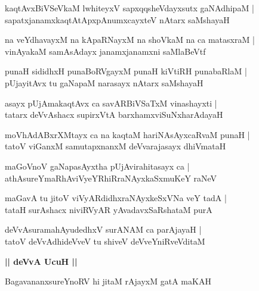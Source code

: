 \documentclass[twoside,12pt,openright]{book}
\newcounter{shloka}[chapter]
\def\uvaca#1{\centerline{{\large\textbf{#1}}}}
\begin{document}
\begin{shloka}%
kaqtAvxBiVSeVkaM lwhiteyxV sapxqqsheVdayxsutx gaNAdhipaM |\\
sapatxjanamxkaqtAtApxpAnumxcayxteV nAtarx saMshayaH 
\end{shloka}

\begin{shloka}%
na veYdhavayxM na kApaRNayxM na shoVkaM na ca matasxraM |\\
vinAyakaM samAsAdayx janamxjanamxni saMlaBeVtf
\end{shloka}

\begin{shloka}%
punaH sididhxH punaBoRVgayxM punaH kiVtiRH punabaRlaM |\\
pUjayitAvx tu gaNapaM narasayx nAtarx saMshayaH
\end{shloka}

\begin{shloka}%
asayx pUjAmakaqtAvx ca savARBiVSaTxM vinashayxti |\\
tatarx deVvAshacx supirxVtA barxhamxviSuNxharAdayaH 
\end{shloka}

\begin{shloka}%
moVhAdABxrXMtayx ca na kaqtaM hariNAsAyxcaRvaM punaH |\\
tatoV viGanxM samutapxnanxM deVvarajasayx dhiVmataH 
\end{shloka}

\begin{shloka}%
maGoVnoV gaNapasAyxtha pUjAvirahitasayx ca |\\
athAsureYmaRhAviVyeYRhiRraNAyxkaSxmuKeY raNeV 
\end{shloka}

\begin{shloka}%
maGavA tu jitoV viVyARdidhxraNAyxkeSxVNa veY tadA |\\
tataH surAshacx niviRVyAR yAvadavxSaRshataM purA 
\end{shloka}

\begin{shloka}%
deVvAsuramahAyudedhxV surANAM ca parAjayaH |\\
tatoV deVvAdhideVveV tu shiveV deVveYniRveVditaM 
\end{shloka}

\uvaca{|| deVvA UcuH ||}

\begin{shloka}%
BagavananxsureYnoRV hi jitaM rAjayxM gatA maKAH 
\end{shloka}
\end{document}

